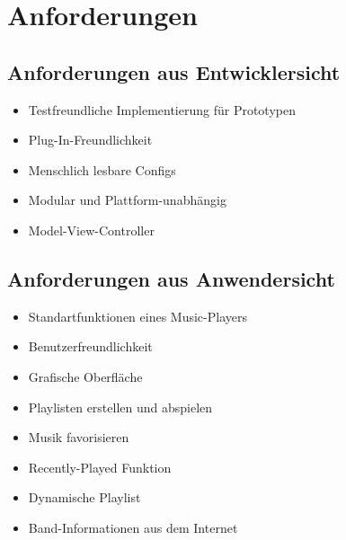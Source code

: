 \chapter{Anforderungen}

\section{Anforderungen aus Entwicklersicht}

\renewcommand{\labelitemi}{•}
\begin{itemize}
	\item Testfreundliche Implementierung für Prototypen
	\item Plug-In-Freundlichkeit
	\item Menschlich lesbare Configs
	\item Modular und Plattform-unabhängig
	\item Model-View-Controller
\end{itemize}

\section{Anforderungen aus Anwendersicht}

\begin{itemize}
	\item Standartfunktionen eines Music-Players
	\item Benutzerfreundlichkeit
	\item Grafische Oberfläche
	\item Playlisten erstellen und abspielen
	\item Musik favorisieren
	\item Recently-Played Funktion
	\item Dynamische Playlist
	\item Band-Informationen aus dem Internet	
\end{itemize}